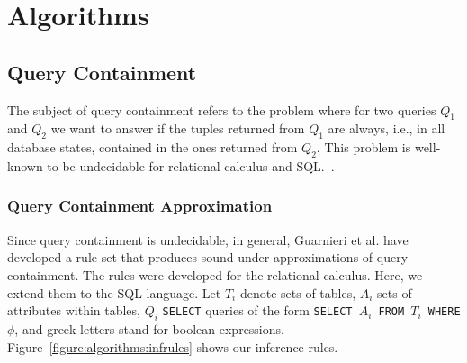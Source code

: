 \section{Algorithms}


\subsection{Query Containment}


The subject of query containment refers to the problem where for two queries $Q_1$ and $Q_2$ we want to answer if the tuples returned from $Q_1$ are always, i.e., in all database states, contained in the ones returned from $Q_2$.
%
This problem is well-known to be undecidable for relational calculus and SQL.~\cite{abiteboul1995foundations}.
%

\subsubsection{Query Containment Approximation}


Since query containment is undecidable, in general, Guarnieri et al. have developed a rule set that produces sound under-approximations of query containment.
%
The rules were developed for the relational calculus.
%
Here, we extend them to the SQL language.
%
Let $T_i$ denote sets of tables, $A_i$ sets of attributes within tables, $Q_i$ \texttt{SELECT} queries of the form \texttt{SELECT $A_i$ FROM $T_i$ WHERE $\phi$}, and greek letters stand for boolean expressions.
%
Figure~\ref{figure:algorithms:infrules} shows our inference rules.



